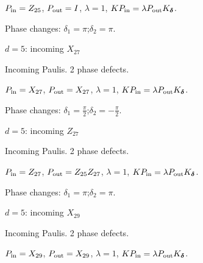 \vspace{-1mm}
$P_{\rm in}=Z_{25}$, \quad $P_{\rm out}=I$, \quad $\lambda=1$, \qquad $K P_{\rm in}=\lambda P_{\rm out}K_{\boldsymbol\delta}$.
\par\smallskip\begin{minipage}{.98\linewidth}\small Phase changes: $\delta_{1}=\pi$;\quad $\delta_{2}=\pi$.\end{minipage}
\vfill
{\footnotesize\texttt{}}
\newpage
{}
{\Large $d=5$: incoming $X_{27}$}\par
Incoming Paulis. 2 phase defects.
\begin{center}
\end{center}
\vspace{-1mm}
$P_{\rm in}=X_{27}$, \quad $P_{\rm out}=X_{27}$, \quad $\lambda=1$, \qquad $K P_{\rm in}=\lambda P_{\rm out}K_{\boldsymbol\delta}$.
\par\smallskip\begin{minipage}{.98\linewidth}\small Phase changes: $\delta_{1}=\frac{\pi}{2}$;\quad $\delta_{2}=-\frac{\pi}{2}$.\end{minipage}
\vfill
{\footnotesize\texttt{}}
\newpage
{}
{\Large $d=5$: incoming $Z_{27}$}\par
Incoming Paulis. 2 phase defects.
\begin{center}
\end{center}
\vspace{-1mm}
$P_{\rm in}=Z_{27}$, \quad $P_{\rm out}=Z_{25}Z_{27}$, \quad $\lambda=1$, \qquad $K P_{\rm in}=\lambda P_{\rm out}K_{\boldsymbol\delta}$.
\par\smallskip\begin{minipage}{.98\linewidth}\small Phase changes: $\delta_{1}=\pi$;\quad $\delta_{2}=\pi$.\end{minipage}
\vfill
{\footnotesize\texttt{}}
\newpage
{}
{\Large $d=5$: incoming $X_{29}$}\par
Incoming Paulis. 2 phase defects.
\begin{center}
\end{center}
\vspace{-1mm}
$P_{\rm in}=X_{29}$, \quad $P_{\rm out}=X_{29}$, \quad $\lambda=1$, \qquad $K P_{\rm in}=\lambda P_{\rm out}K_{\boldsymbol\delta}$.
